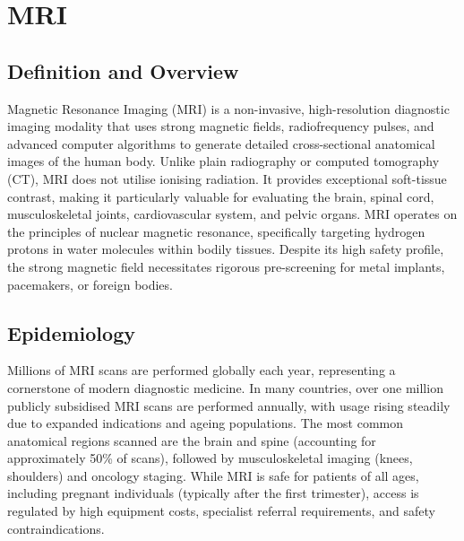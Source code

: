 \chapter{MRI}

\section*{Definition and Overview}
Magnetic Resonance Imaging (MRI) is a non-invasive, high-resolution diagnostic imaging modality that uses strong magnetic fields, radiofrequency pulses, and advanced computer algorithms to generate detailed cross-sectional anatomical images of the human body. Unlike plain radiography or computed tomography (CT), MRI does not utilise ionising radiation. It provides exceptional soft-tissue contrast, making it particularly valuable for evaluating the brain, spinal cord, musculoskeletal joints, cardiovascular system, and pelvic organs. MRI operates on the principles of nuclear magnetic resonance, specifically targeting hydrogen protons in water molecules within bodily tissues. Despite its high safety profile, the strong magnetic field necessitates rigorous pre-screening for metal implants, pacemakers, or foreign bodies.

\section*{Epidemiology}
Millions of MRI scans are performed globally each year, representing a cornerstone of modern diagnostic medicine. In many countries, over one million publicly subsidised MRI scans are performed annually, with usage rising steadily due to expanded indications and ageing populations. The most common anatomical regions scanned are the brain and spine (accounting for approximately 50\% of scans), followed by musculoskeletal imaging (knees, shoulders) and oncology staging. While MRI is safe for patients of all ages, including pregnant individuals (typically after the first trimester), access is regulated by high equipment costs, specialist referral requirements, and safety contraindications.

